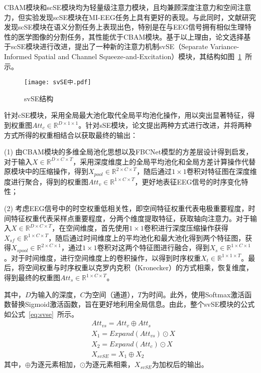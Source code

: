 CBAM模块和scSE模块均为轻量级注意力模块，且均兼顾深度注意力和空间注意力，但实验发现scSE模块在MI-EEG任务上具有更好的表现。与此同时，文献\cite{roy2018concurrent}研究发现scSE模块在语义分割任务上表现出色，特别是在与EEG信号拥有相似生理特性的医学图像的分割任务，其性能优于CBAM模块。基于以上理由，论文选择基于scSE模块进行改进，提出了一种新的注意力机制svSE（Separate Variance-Informed Spatial and Channel Squeeze-and-Excitation）模块，其结构如图~\ref{fig:svSE}~所示。
\begin{figure}[ht]
    \centering
    \texttt{[image: svSE中.pdf]}
    \caption{svSE结构}
    \label{fig:svSE}
\end{figure}

针对cSE模块，采用全局最大池化取代全局平均池化操作，用以突出显著特征，得到权重图\(Att_c \in \mathbb{R}^{D \times 1 \times 1}\)。针对sSE模块，论文提出两种方式进行改进，并将两种方式所得的权重相结合以获取最终的输出：

(1) 由CBAM模块的多维全局池化思想以及FBCNet模型的方差层设计\cite{mane2021fbcnet}得到启发，对于输入\(X \in \mathbb{R}^{D \times C \times T}\)，采用深度维度上的全局平均池化和全局方差计算操作代替原模块中的压缩操作，得到\(X_{pool} \in \mathbb{R}^{2 \times C \times T}\)，随后通过\(1\times1\)卷积对特征图在深度维度进行聚合，得到的权重图\(Att_v \in \mathbb{R}^{1 \times C \times T}\)，更好地表征EEG信号的时序变化特性；

(2) 考虑EEG信号中的时空权重低相关性，即空间特征权重代表电极重要程度，时间特征权重代表采样点重要程度，分两个维度提取特征，获取轴向注意力。对于输入\(X \in \mathbb{R}^{D \times C \times T}\)，在空间维度，首先使用\(1\times1\)卷积进行深度压缩操作获得\(X_{sf} \in \mathbb{R}^{1 \times C \times T}\)，随后通过时间维度上的平均池化和最大池化得到两个特征图，获得\(X_{spool} \in \mathbb{R}^{2 \times C \times 1}\)，通过\(1\times1\)卷积对这两个特征图进行融合，得到\(X_s \in \mathbb{R}^{1 \times C \times 1}\)。对于时间维度，进行空间维度上的卷积操作，以得到时序权重\(X_t \in \mathbb{R}^{1 \times 1 \times T}\)。最后，将空间权重与时序权重以克罗内克积（Kronecker）的方式相乘，恢复维度，得到最终的权重图\(Att_s \in \mathbb{R}^{1 \times C \times T}\)。

其中，\(D\)为输入的深度，\(C\)为空间（通道），\(T\)为时间。此外，使用Softmax激活函数替换Sigmoid激活函数，旨在更好地利用全局信息。由此，整个svSE模块的公式如公式~\ref{eq:svse}~所示。
\begin{equation}\label{eq:svse}
    \begin{aligned}
        &Att_{vs}=Att_v \oplus Att_s \\
        &X_1=Expand(Att_{vs}) \odot X \\
        &X_2=Expand(Att_c) \odot X \\
        &X_{svSE}=X_1 \oplus X_2
    \end{aligned}
\end{equation}
其中，\(\oplus\)为逐元素相加，\(\odot\)为逐元素相乘，\(X_{svSE}\)为加权后的输出。

